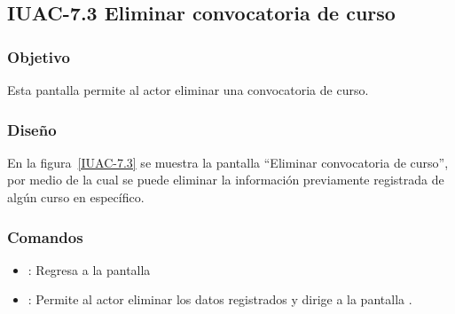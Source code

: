 \subsection{IUAC-7.3 Eliminar convocatoria de curso}
 
\subsubsection{Objetivo}

    Esta pantalla permite al actor  eliminar una convocatoria de curso.

\subsubsection{Diseño}

    En la figura~\ref{IUAC-7.3} se muestra la pantalla ``Eliminar convocatoria de curso'', por medio de la cual se puede eliminar la información previamente registrada de algún curso en específico. \\


\subsubsection{Comandos}
\begin{itemize}
	\item {}: Regresa a la pantalla 
	\item {}: Permite al actor eliminar los datos registrados y dirige a la pantalla .
\end{itemize}
